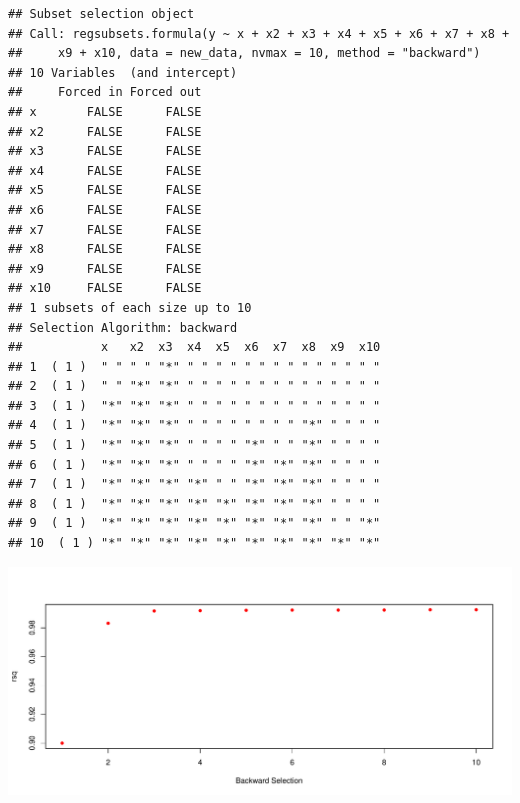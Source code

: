 \documentclass[]{article}
\newenvironment{Shaded}{\begin{snugshade}}{\end{snugshade}}
\newcommand{\KeywordTok}[1]{\textcolor[rgb]{0.13,0.29,0.53}{\textbf{#1}}}
\newcommand{\DataTypeTok}[1]{\textcolor[rgb]{0.13,0.29,0.53}{#1}}
\newcommand{\DecValTok}[1]{\textcolor[rgb]{0.00,0.00,0.81}{#1}}
\newcommand{\StringTok}[1]{\textcolor[rgb]{0.31,0.60,0.02}{#1}}
\newcommand{\OperatorTok}[1]{\textcolor[rgb]{0.81,0.36,0.00}{\textbf{#1}}}
\newcommand{\NormalTok}[1]{#1}
\begin{document}
\begin{verbatim}
## Subset selection object
## Call: regsubsets.formula(y ~ x + x2 + x3 + x4 + x5 + x6 + x7 + x8 + 
##     x9 + x10, data = new_data, nvmax = 10, method = "backward")
## 10 Variables  (and intercept)
##     Forced in Forced out
## x       FALSE      FALSE
## x2      FALSE      FALSE
## x3      FALSE      FALSE
## x4      FALSE      FALSE
## x5      FALSE      FALSE
## x6      FALSE      FALSE
## x7      FALSE      FALSE
## x8      FALSE      FALSE
## x9      FALSE      FALSE
## x10     FALSE      FALSE
## 1 subsets of each size up to 10
## Selection Algorithm: backward
##           x   x2  x3  x4  x5  x6  x7  x8  x9  x10
## 1  ( 1 )  " " " " "*" " " " " " " " " " " " " " "
## 2  ( 1 )  " " "*" "*" " " " " " " " " " " " " " "
## 3  ( 1 )  "*" "*" "*" " " " " " " " " " " " " " "
## 4  ( 1 )  "*" "*" "*" " " " " " " " " "*" " " " "
## 5  ( 1 )  "*" "*" "*" " " " " "*" " " "*" " " " "
## 6  ( 1 )  "*" "*" "*" " " " " "*" "*" "*" " " " "
## 7  ( 1 )  "*" "*" "*" "*" " " "*" "*" "*" " " " "
## 8  ( 1 )  "*" "*" "*" "*" "*" "*" "*" "*" " " " "
## 9  ( 1 )  "*" "*" "*" "*" "*" "*" "*" "*" " " "*"
## 10  ( 1 ) "*" "*" "*" "*" "*" "*" "*" "*" "*" "*"
\end{verbatim}

\begin{Shaded}
\end{Shaded}

\includegraphics{hw2_fall18_files/figure-latex/unnamed-chunk-5-2.pdf}
\end{document}
